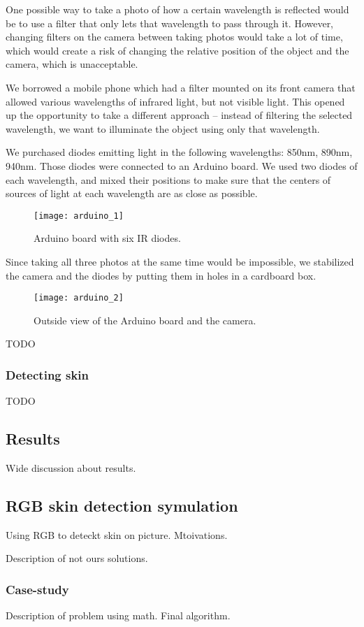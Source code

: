             One possible way to take a photo of how a certain wavelength is reflected
            would be to use a filter that only lets that wavelength to pass through it.
            However, changing filters on the camera between taking photos would take
            a lot of time, which would create a risk of changing the relative position
            of the object and the camera, which is unacceptable.

            We borrowed a mobile phone which had a filter mounted on its front camera
            that allowed various wavelengths of infrared light, but not visible light.
            This opened up the opportunity to take a different approach -- instead
            of filtering the selected wavelength, we want to illuminate the object
            using only that wavelength.

            We purchased diodes emitting light in the following wavelengths:
            850nm, 890nm, 940nm. Those diodes were connected to an Arduino board.
            We used two diodes of each wavelength, and mixed their positions to
            make sure that the centers of sources of light at each wavelength
            are as close as possible.

            \begin{figure}[H]
                \caption{Arduino board with six IR diodes.}
                \centering
                \texttt{[image: arduino\_1]}
                \label{fig:arduino_1}
            \end{figure}

            Since taking all three photos at the same time would be impossible,
            we stabilized the camera and the diodes by putting them in holes
            in a cardboard box.

            \begin{figure}[H]
                \caption{Outside view of the Arduino board and the camera.}
                \centering
                \texttt{[image: arduino\_2]}
                \label{fig:arduino_2}
            \end{figure}

            TODO

            \subsubsection*{Detecting skin}
            TODO

    \subsection{Results}
        Wide discussion about results.

    \subsection{RGB skin detection symulation}
        Using RGB to deteckt skin on picture.
        Mtoivations.

        Description of not ours solutions.

        \subsubsection*{Case-study}
            Description of problem using math.
            Final algorithm.
